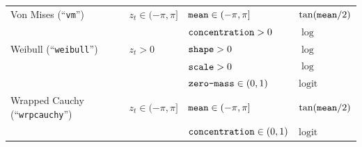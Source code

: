 \documentclass[12pt]{article}
\begin{document}
\begin{table}
\begin{tabular}{llll}
  Von Mises (``\verb|vm|'')            & $z_t\in(-\pi,\pi]$       & $\verb|mean|\in(-\pi,\pi]$       &  $\tan(\verb|mean|/2)$ \tabularnewline  
                                       &                          & $\verb|concentration|>0$         &  $\log$ \tabularnewline 
  Weibull (``\verb|weibull|'')         & $z_t>0$                  & $\verb|shape|>0$                 &  $\log$ \tabularnewline  
                                       &                          & $\verb|scale|>0$                 &  $\log$ \tabularnewline  
                                       &                          & $\verb|zero-mass|\in(0,1)$       &  $\text{logit}$ \tabularnewline 
  Wrapped Cauchy (``\verb|wrpcauchy|'')& $z_t\in(-\pi,\pi]$       & $\verb|mean|\in(-\pi,\pi]$       &  $\tan(\verb|mean|/2)$ \tabularnewline  
                                       &                          & $\verb|concentration|\in(0,1)$ &  $\text{logit}$ \tabularnewline 
  \bottomrule
  \end{tabular}
\end{table}

\end{document}
